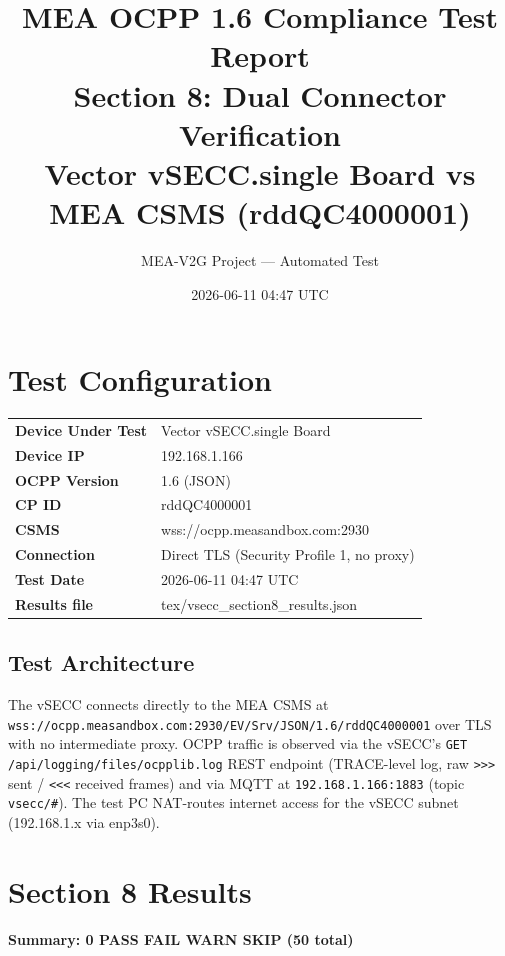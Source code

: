 \documentclass[10pt, a4paper]{article}
\title{\textbf{MEA OCPP 1.6 Compliance Test Report}\\[0.3em]
\large Section 8: Dual Connector Verification\\[0.3em]
\normalsize Vector vSECC.single Board vs MEA CSMS (rddQC4000001)}
\author{MEA-V2G Project --- Automated Test}
\date{2026-06-11 04:47 UTC}
\begin{document}
\maketitle
\tableofcontents
\newpage

\section{Test Configuration}
\begin{tabular}{ll}
\textbf{Device Under Test} & Vector vSECC.single Board \\
\textbf{Device IP}         & 192.168.1.166 \\
\textbf{OCPP Version}      & 1.6 (JSON) \\
\textbf{CP ID}             & rddQC4000001 \\
\textbf{CSMS}              & wss://ocpp.measandbox.com:2930 \\
\textbf{Connection}        & Direct TLS (Security Profile 1, no proxy) \\
\textbf{Test Date}         & 2026-06-11 04:47 UTC \\
\textbf{Results file}      & tex/vsecc\_section8\_results.json \\
\end{tabular}

\subsection*{Test Architecture}
The vSECC connects directly to the MEA CSMS at
\texttt{wss://ocpp.measandbox.com:2930/EV/Srv/JSON/1.6/rddQC4000001}
over TLS with no intermediate proxy.
OCPP traffic is observed via the vSECC's \texttt{GET /api/logging/files/ocpplib.log}
REST endpoint (TRACE-level log, raw \texttt{>>>} sent / \texttt{<<<} received frames)
and via MQTT at \texttt{192.168.1.166:1883} (topic \texttt{vsecc/\#}).
The test PC NAT-routes internet access for the vSECC subnet (192.168.1.x via enp3s0).

\section{Section 8 Results}
\textbf{Summary: 0 PASS  FAIL  WARN  SKIP \quad (50 total)}
\end{document}
